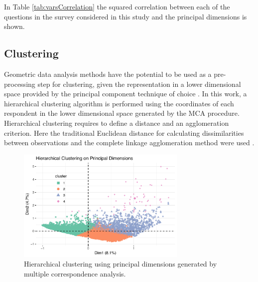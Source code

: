 \documentclass[conference,final,]{IEEEtran}
\begin{document}
In Table \ref{tab:varsCorrelation} the squared correlation between each
of the questions in the survey considered in this study and the
principal dimensions is shown.

\hypertarget{clustering}{%
\subsection{Clustering}\label{clustering}}

Geometric data analysis methods have the potential to be used as a
pre-processing step for clustering, given the representation in a lower
dimensional space provided by the principal component technique of
choice \cite{jolliffe2002principal}. In this work, a hierarchical
clustering algorithm is performed using the coordinates of each
respondent in the lower dimensional space generated by the MCA
procedure. Hierarchical clustering requires to define a distance and an
agglomeration criterion. Here the traditional Euclidean distance for
calculating dissimilarities between observations and the complete
linkage agglomeration method were used \cite{tan2013data}.

\begin{figure}[h!] 
\centering 
\includegraphics[width=3.2in]{../figs/new_hclust.pdf}
\caption{Hierarchical clustering using principal dimensions generated by multiple correspondence analysis.}
\label{fig:hclust} 
\end{figure}
\end{document}
